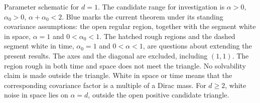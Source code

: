 Parameter schematic for $d = 1$. The candidate range for investigation is
$\alpha > 0$, $\alpha_0 > 0$, $\alpha + \alpha_0 < 2$. Blue marks the current
theorem under its standing covariance assumptions: the open regular region,
together with the segment white in space, $\alpha = 1$ and $0 < \alpha_0 < 1$.
The hatched rough regions and the dashed segment white in time, $\alpha_0 = 1$
and $0 < \alpha < 1$, are questions about extending the present results. The
axes and the diagonal are excluded, including $(1,1)$. The region rough in both
time and space does not meet the triangle. No solvability claim is made outside
the triangle. White in space or time means that the corresponding covariance
factor is a multiple of a Dirac mass. For $d \ge 2$, white noise in space lies
on $\alpha = d$, outside the open positive candidate triangle.
